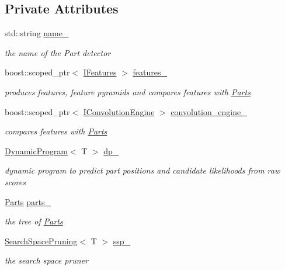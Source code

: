 \subsection*{Private Attributes}
\begin{DoxyCompactItemize}
\item 
std\+::string \hyperlink{classPartsBasedDetector_a776c766541fb4c2974c6b40a8f4f1c2f}{name\+\_\+}
\begin{DoxyCompactList}\small\item\em the name of the Part detector \end{DoxyCompactList}\item 
boost\+::scoped\+\_\+ptr$<$ \hyperlink{classIFeatures}{I\+Features} $>$ \hyperlink{classPartsBasedDetector_a6242f9b02fcb1a440cc431f2fc15521f}{features\+\_\+}
\begin{DoxyCompactList}\small\item\em produces features, feature pyramids and compares features with \hyperlink{classParts}{Parts} \end{DoxyCompactList}\item 
boost\+::scoped\+\_\+ptr$<$ \hyperlink{classIConvolutionEngine}{I\+Convolution\+Engine} $>$ \hyperlink{classPartsBasedDetector_ad06eb05d590004fe4f6940544b90b2ba}{convolution\+\_\+engine\+\_\+}
\begin{DoxyCompactList}\small\item\em compares features with \hyperlink{classParts}{Parts} \end{DoxyCompactList}\item 
\hyperlink{classDynamicProgram}{Dynamic\+Program}$<$ T $>$ \hyperlink{classPartsBasedDetector_af78da81781a7ad393e9e150f02ecd129}{dp\+\_\+}
\begin{DoxyCompactList}\small\item\em dynamic program to predict part positions and candidate likelihoods from raw scores \end{DoxyCompactList}\item 
\hyperlink{classParts}{Parts} \hyperlink{classPartsBasedDetector_ad548ec9214858535eb6a0f3783d11664}{parts\+\_\+}
\begin{DoxyCompactList}\small\item\em the tree of \hyperlink{classParts}{Parts} \end{DoxyCompactList}\item 
\hyperlink{classSearchSpacePruning}{Search\+Space\+Pruning}$<$ T $>$ \hyperlink{classPartsBasedDetector_aae91c693f9d01e3e6cbd552d7f81e474}{ssp\+\_\+}
\begin{DoxyCompactList}\small\item\em the search space pruner \end{DoxyCompactList}\end{DoxyCompactItemize}


